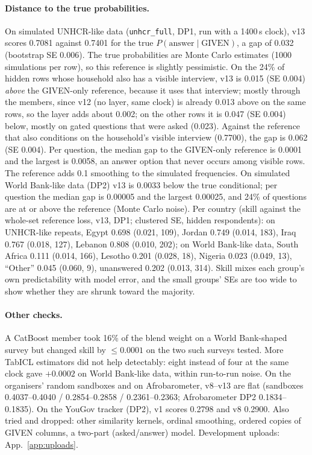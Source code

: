 \documentclass{article}
\begin{document}
\paragraph{Distance to the true probabilities.} On simulated UNHCR-like data (\texttt{unhcr\_full}, DP1, run with a 1400\,s clock), v13 scores 0.7081 against 0.7401 for the true $P(\text{answer}\mid\text{GIVEN})$, a gap of 0.032 (bootstrap SE 0.006). The true probabilities are Monte Carlo estimates (1000 simulations per row), so this reference is slightly pessimistic. On the 24\% of hidden rows whose household also has a visible interview, v13 is 0.015 (SE 0.004) \emph{above} the GIVEN-only reference, because it uses that interview; mostly through the members, since v12 (no layer, same clock) is already 0.013 above on the same rows, so the layer adds about 0.002; on the other rows it is 0.047 (SE 0.004) below, mostly on gated questions that were asked (0.023). Against the reference that also conditions on the household's visible interview (0.7700), the gap is 0.062 (SE 0.004). Per question, the median gap to the GIVEN-only reference is 0.0001 and the largest is 0.0058, an answer option that never occurs among visible rows. The reference adds 0.1 smoothing to the simulated frequencies. On simulated World Bank-like data (DP2) v13 is 0.0033 below the true conditional; per question the median gap is 0.00005 and the largest 0.00025, and 24\% of questions are at or above the reference (Monte Carlo noise). Per country (skill against the whole-set reference loss, v13, DP1; clustered SE, hidden respondents): on UNHCR-like repeats, Egypt 0.698 (0.021, 109), Jordan 0.749 (0.014, 183), Iraq 0.767 (0.018, 127), Lebanon 0.808 (0.010, 202); on World Bank-like data, South Africa 0.111 (0.014, 166), Lesotho 0.201 (0.028, 18), Nigeria 0.023 (0.049, 13), ``Other'' 0.045 (0.060, 9), unanswered 0.202 (0.013, 314). Skill mixes each group's own predictability with model error, and the small groups' SEs are too wide to show whether they are shrunk toward the majority.

\paragraph{Other checks.} A CatBoost member \citep{prokhorenkova2018catboost} took 16\% of the blend weight on a World Bank-shaped survey but changed skill by $\le0.0001$ on the two such surveys tested. More TabICL estimators did not help detectably: eight instead of four at the same clock gave $+0.0002$ on World Bank-like data, within run-to-run noise. On the organisers' random sandboxes and on Afrobarometer, v8--v13 are flat (sandboxes 0.4037--0.4040 / 0.2854--0.2858 / 0.2361--0.2363; Afrobarometer DP2 0.1834--0.1835). On the YouGov tracker (DP2), v1 scores 0.2798 and v8 0.2900. Also tried and dropped: other similarity kernels, ordinal smoothing, ordered copies of GIVEN columns, a two-part (asked/answer) model. Development uploads: App.~\ref{app:uploads}.
\end{document}
